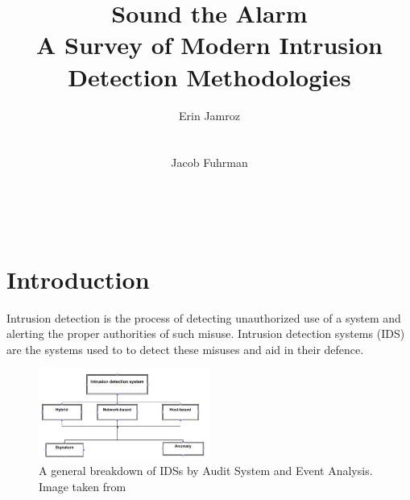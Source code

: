 \documentclass{acm_proc_article-sp}
\begin{document}
\title{Sound the Alarm\\A Survey of Modern Intrusion Detection Methodologies}

\author{
\alignauthor
Erin Jamroz
       \\
       \\
       \\
\alignauthor
Jacob Fuhrman
       \\
       \\
       \\
       \\       
}

\maketitle

\begin{abstract}
\end{abstract}

\section{Introduction}
	Intrusion detection is the process of detecting unauthorized use of a system and alerting the proper authorities of such misuse. Intrusion detection systems (IDS) are the systems used to to detect these misuses and aid in their defence. 
	\begin{figure}[h!]
		\centering
		\includegraphics[width=0.5\textwidth]{idsBreakdown.png}
		\caption{A general breakdown of IDSs by Audit System and Event Analysis. Image taken from \cite{Alenezi2012}}
		\label{breakdown}
	\end{figure}
\end{document}
